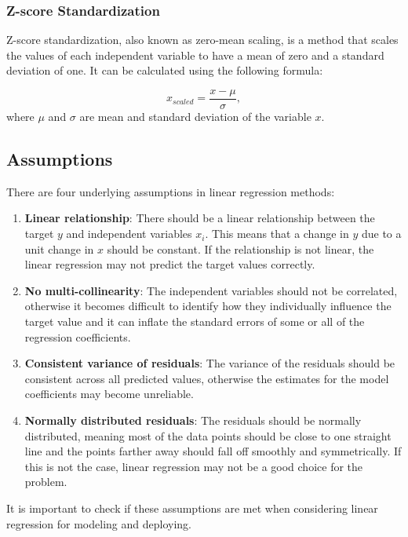 \newpage

\subsubsection{\textbf{Z-score Standardization}}
Z-score standardization, also known as zero-mean scaling, is a method that scales the values of each independent variable to have a mean of zero and a standard deviation of one. It can be calculated using the following formula:

\begin{equation}\label{eq:standardization}
   x_{scaled} = \frac{x-\mu}{\sigma},
\end{equation}where $\mu$ and $\sigma$ are mean and standard deviation of the variable $x$.

\newpage
\subsection{Assumptions}
There are four underlying assumptions in linear regression methods:
\begin{enumerate}
  \item \textbf{Linear relationship}: There should be a linear relationship between the target $y$ and independent variables $x_i$. This means that a change in $y$ due to a unit change in $x$  should be constant. If the relationship is not linear, the linear regression may not predict the target values correctly.
  \item \textbf{No multi-collinearity}: The independent variables should not be correlated, otherwise it becomes difficult to identify how they individually influence the target value and it can inflate the standard errors of some or all of the regression coefficients.
  \item \textbf{Consistent variance of residuals}: The variance of the residuals should be consistent across all predicted values, otherwise the estimates for the model coefficients may become unreliable.
  \item \textbf{Normally distributed residuals}: The residuals should be normally distributed, meaning most of the data points should be close to one straight line and the points farther away should fall off smoothly and symmetrically. If this is not the case, linear regression may not be a good choice for the problem.
\end{enumerate}

It is important to check if these assumptions are met when considering linear regression for modeling and deploying.

